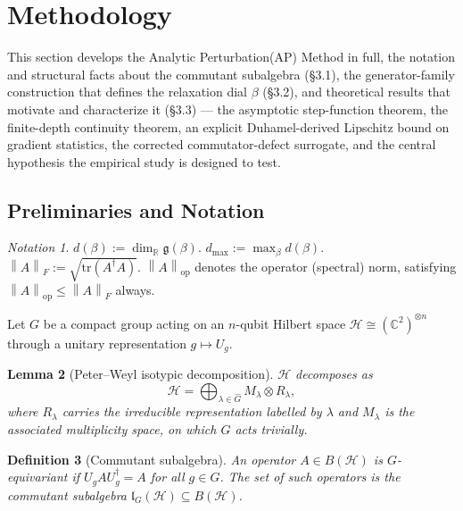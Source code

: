 \documentclass[10pt,twocolumn]{article}
\newtheorem{definition}{Definition}[section]
\newtheorem{lemma}[definition]{Lemma}
\theoremstyle{remark}
\newtheorem{notation}[definition]{Notation}
\newcommand{\Hil}{\mathcal{H}}
\newcommand{\lG}{\mathfrak{l}_G(\Hil)}
\newcommand{\opnorm}[1]{\left\lVert #1 \right\rVert_{\mathrm{op}}}
\newcommand{\fronorm}[1]{\left\lVert #1 \right\rVert_{F}}
\begin{document}
\section{Methodology}



This section develops the Analytic Perturbation(AP) Method in full, the notation and structural
facts about the commutant subalgebra (\S3.1), the generator-family construction that defines the relaxation dial
$\beta$ (\S3.2), and theoretical results that motivate and characterize it (\S3.3) — the asymptotic step-function
theorem, the finite-depth continuity theorem, an explicit Duhamel-derived Lipschitz bound on gradient statistics,
the corrected commutator-defect surrogate, and the central hypothesis the empirical study is designed to test.
\subsection{Preliminaries and Notation}

\begin{notation}
\label{not:symbols}
$d(\beta) := \dim_{\mathbb{R}} \mathfrak{g}(\beta)$.  $d_{\max} := \max_\beta d(\beta)$.  $\fronorm{A} := \sqrt{\mathrm{tr}(A^\dagger A)}$.  $\opnorm{A}$ denotes the operator (spectral) norm, satisfying $\opnorm{A} \le \fronorm{A}$ always.
\end{notation}
\label{sec:prelim}

Let $G$ be a compact group acting on an $n$-qubit Hilbert space $\Hil \cong (\mathbb{C}^2)^{\otimes n}$ through a unitary representation $g \mapsto U_g$.

\begin{lemma}[Peter--Weyl isotypic decomposition]
\label{lem:peterweyl}
$\Hil$ decomposes as
\begin{equation}
\Hil = \bigoplus_{\lambda \in \hat{G}} M_\lambda \otimes R_\lambda, \label{eq:1}
\end{equation}
where $R_\lambda$ carries the irreducible representation labelled by $\lambda$ and $M_\lambda$ is the associated multiplicity space, on which $G$ acts trivially.
\end{lemma}

\begin{definition}[Commutant subalgebra]
\label{def:commutant}
An operator $A \in B(\Hil)$ is $G$-equivariant if $U_g A U_g^\dagger = A$ for all $g \in G$. The set of such operators is the commutant subalgebra $\lG \subseteq B(\Hil)$.
\end{definition}
\end{document}
